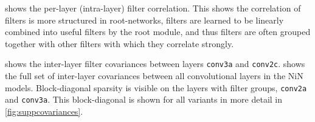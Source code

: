 \documentclass[thesis]{subfiles}
\begin{document}
	 shows the per-layer (intra-layer) filter correlation. This shows the correlation of filters is more structured in root-networks, filters are learned to be linearly combined into useful filters by the root module, and thus filters are often grouped together with other filters with which they correlate strongly.
	
	 shows the inter-layer filter covariances between layers \texttt{conv3a} and \texttt{conv2c}.  shows the full set of inter-layer covariances between all convolutional layers in the NiN models. Block-diagonal sparsity is visible on the layers with filter groups, \texttt{conv2a} and \texttt{conv3a}. This block-diagonal is shown for all variants in more detail in \cref{fig:suppcovariances}.
	
\end{document}
